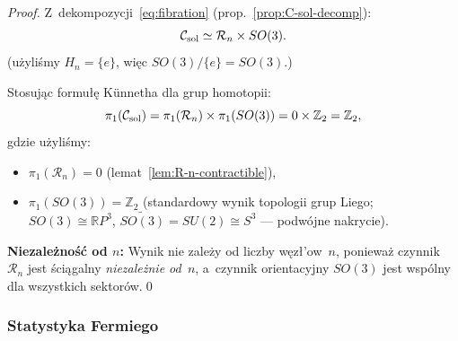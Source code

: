 \begin{proof}
Z~dekompozycji~\eqref{eq:fibration}
(prop.~\ref{prop:C-sol-decomp}):
\begin{equation}
  \mathcal{C}_{\rm sol} \simeq \mathcal{R}_n \times SO(3).
\end{equation}
(u\.zyli\'smy $H_n = \{e\}$, wi\k{e}c $SO(3)/\{e\} = SO(3)$.)

Stosuj\k{a}c formu\l{}\k{e} K\"unnetha dla grup homotopii:
\begin{equation}
  \pi_1(\mathcal{C}_{\rm sol})
  = \pi_1(\mathcal{R}_n) \times \pi_1(SO(3))
  = 0 \times \mathbb{Z}_2
  = \mathbb{Z}_2,
\end{equation}
gdzie u\.zyli\'smy:
\begin{itemize}[nosep]
  \item $\pi_1(\mathcal{R}_n) = 0$
        (lemat~\ref{lem:R-n-contractible}),
  \item $\pi_1(SO(3)) = \mathbb{Z}_2$
        (standardowy wynik topologii grup Liego;
        $SO(3) \cong \mathbb{R}P^3$,
        $\widetilde{SO(3)} = SU(2) \cong S^3$
        --- podw\'ojne nakrycie).
\end{itemize}

\textbf{Niezale\.zno\'s\'c od $n$:}
Wynik nie zale\.zy od liczby w\k{e}z\l{}'ow~$n$,
poniewa\.z czynnik $\mathcal{R}_n$ jest \'sci\k{a}galny
\emph{niezale\.znie od~$n$}, a~czynnik orientacyjny
$SO(3)$ jest wsp\'olny dla wszystkich sektor\'ow.\qed
\end{proof}

\subsubsection{Statystyka Fermiego}%
\label{sssec:fermi-stats}

